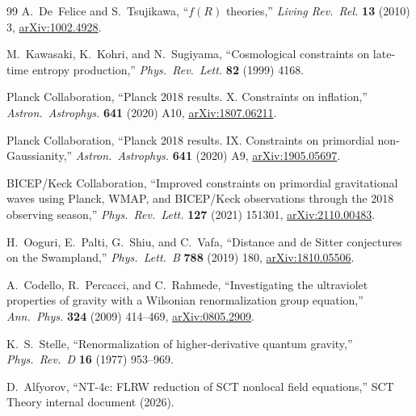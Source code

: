 \documentclass[11pt,a4paper]{article}
\theoremstyle{plain}
\theoremstyle{definition}
\begin{document}
\begin{thebibliography}{99}
A.~De~Felice and S.~Tsujikawa,
``$f(R)$ theories,''
\emph{Living Rev.\ Rel.} \textbf{13} (2010) 3,
\href{https://arxiv.org/abs/1002.4928}{arXiv:1002.4928}.

M.~Kawasaki, K.~Kohri, and N.~Sugiyama,
``Cosmological constraints on late-time entropy production,''
\emph{Phys.\ Rev.\ Lett.} \textbf{82} (1999) 4168.

Planck Collaboration,
``Planck 2018 results. X. Constraints on inflation,''
\emph{Astron.\ Astrophys.} \textbf{641} (2020) A10,
\href{https://arxiv.org/abs/1807.06211}{arXiv:1807.06211}.

Planck Collaboration,
``Planck 2018 results. IX. Constraints on primordial
non-Gaussianity,''
\emph{Astron.\ Astrophys.} \textbf{641} (2020) A9,
\href{https://arxiv.org/abs/1905.05697}{arXiv:1905.05697}.

BICEP/Keck Collaboration,
``Improved constraints on primordial gravitational waves using
Planck, WMAP, and BICEP/Keck observations through the 2018
observing season,''
\emph{Phys.\ Rev.\ Lett.} \textbf{127} (2021) 151301,
\href{https://arxiv.org/abs/2110.00483}{arXiv:2110.00483}.

H.~Ooguri, E.~Palti, G.~Shiu, and C.~Vafa,
``Distance and de Sitter conjectures on the Swampland,''
\emph{Phys.\ Lett.\ B} \textbf{788} (2019) 180,
\href{https://arxiv.org/abs/1810.05506}{arXiv:1810.05506}.

A.~Codello, R.~Percacci, and C.~Rahmede,
``Investigating the ultraviolet properties of gravity with a
Wilsonian renormalization group equation,''
\emph{Ann.\ Phys.} \textbf{324} (2009) 414--469,
\href{https://arxiv.org/abs/0805.2909}{arXiv:0805.2909}.

K.~S.~Stelle,
``Renormalization of higher-derivative quantum gravity,''
\emph{Phys.\ Rev.\ D} \textbf{16} (1977) 953--969.

D.~Alfyorov,
``NT-4c: FLRW reduction of SCT nonlocal field equations,''
SCT Theory internal document (2026).

\end{thebibliography}
\end{document}
